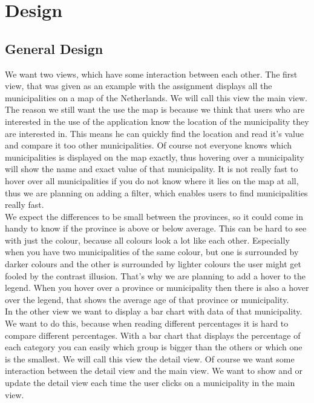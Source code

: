 \section{Design}\label{Sec:Des}
\subsection{General Design}
We want two views, which have some interaction between each other. The first view, that was given as an example with the assignment displays all the municipalities on a map of the Netherlands. We will call this view the main view. The reason we still want the use the map is because we think that users who are interested in the use of the application know the location of the municipality they are interested in. This means he can quickly find the location and read it's value and compare it too other municipalities. Of course not everyone knows which municipalities is displayed on the map exactly, thus hovering over a municipality will show the name and exact value of that municipality. It is not really fast to hover over all municipalities if you do not know where it lies on the map at all, thus we are planning on adding a filter, which enables users to find municipalities really fast. \\
We expect the differences to be small between the provinces, so it could come in handy to know if the province is above or below average. This can be hard to see with just the colour, because all colours look a lot like each other. Especially when you have two municipalities of the same colour, but one is surrounded by darker colours and the other is surrounded by lighter colours the user might get fooled by the contrast illusion. That's why we are planning to add a hover to the legend. When you hover over a province or municipality then there is also a hover over the legend, that shows the average age of that province or municipality.\\
In the other view we want to display a bar chart with data of that municipality.  We want to do this, because when reading different percentages it is hard to compare different percentages. With a bar chart that displays the percentage of each category you can easily which group is bigger than the others or which one is the smallest. We will call this view the detail view. Of course we want some interaction between the detail view and the main view. We want to show and or update the detail view each time the user clicks on a municipality in the main view. \\
